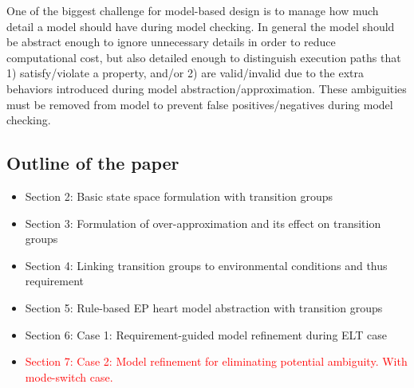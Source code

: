 One of the biggest challenge for model-based design is to manage how much detail a model should have during model checking. In general the model should be abstract enough to ignore unnecessary details in order to reduce computational cost, but also detailed enough to distinguish execution paths that 1) satisfy/violate a property, and/or 2) are valid/invalid due to the extra behaviors introduced during model abstraction/approximation. These ambiguities must be removed from model to prevent false positives/negatives during model checking. 

\subsection{Outline of the paper}
\begin{itemize}
	\item Section 2: Basic state space formulation with transition groups
    \item Section 3: Formulation of over-approximation and its effect on transition groups
    \item Section 4: Linking transition groups to environmental conditions and thus requirement
    \item Section 5: Rule-based EP heart model abstraction with transition groups
    \item Section 6: Case 1: Requirement-guided model refinement during ELT case 
    \item\textcolor{red}{ Section 7: Case 2: Model refinement for eliminating potential ambiguity. With mode-switch case.} 
\end{itemize}

%
%